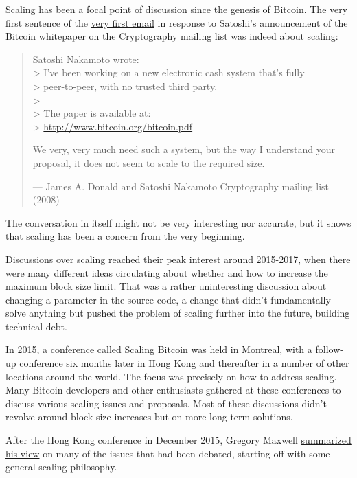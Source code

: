 Scaling has been a focal point of discussion since the genesis of
Bitcoin. The very first sentence of the
\href{https://www.metzdowd.com/pipermail/cryptography/2008-November/014814.html}{very
first email} in response to Satoshi's announcement of the Bitcoin
whitepaper on the Cryptography mailing list was indeed about scaling:

\begin{quote}
Satoshi Nakamoto wrote:\\
\textgreater{} I've been working on a new electronic cash system that's
fully\\
\textgreater{} peer-to-peer, with no trusted third party.\\
\textgreater{}\\
\textgreater{} The paper is available at:\\
\textgreater{} \url{http://www.bitcoin.org/bitcoin.pdf}

We very, very much need such a system, but the way I understand your
proposal, it does not seem to scale to the required size.

---  James A. Donald and Satoshi Nakamoto Cryptography mailing list
(2008)
\end{quote}

The conversation in itself might not be very interesting nor accurate,
but it shows that scaling has been a concern from the very beginning.

Discussions over scaling reached their peak interest around 2015-2017,
when there were many different ideas circulating about whether and how
to increase the maximum block size limit. That was a rather
uninteresting discussion about changing a parameter in the source code,
a change that didn't fundamentally solve anything but pushed the problem
of scaling further into the future, building technical debt.

In 2015, a conference called \href{https://scalingbitcoin.org/}{Scaling
Bitcoin} was held in Montreal, with a follow-up conference six months
later in Hong Kong and thereafter in a number of other locations around
the world. The focus was precisely on how to address scaling. Many
Bitcoin developers and other enthusiasts gathered at these conferences
to discuss various scaling issues and proposals. Most of these
discussions didn't revolve around block size increases but on more
long-term solutions.

After the Hong Kong conference in December 2015, Gregory Maxwell
\href{https://lists.linuxfoundation.org/pipermail/bitcoin-dev/2015-December/011865.html}{summarized
his view} on many of the issues that had been debated, starting off with
some general scaling philosophy.

